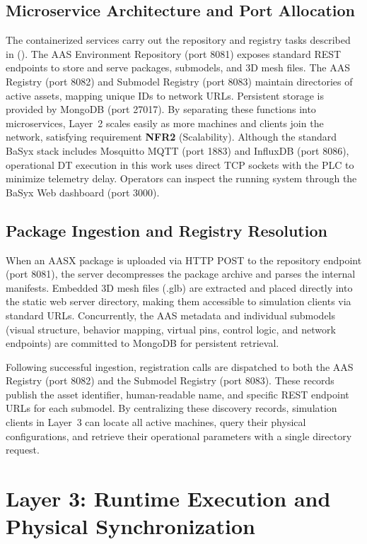\subsection{Microservice Architecture and Port Allocation}
The containerized services carry out the repository and registry tasks described in  (). The \gls{AAS} Environment Repository (port 8081) exposes standard \gls{REST} endpoints to store and serve packages, submodels, and 3D mesh files. The \gls{AAS} Registry (port 8082) and Submodel Registry (port 8083) maintain directories of active assets, mapping unique IDs to network URLs. Persistent storage is provided by MongoDB (port 27017). By separating these functions into microservices, Layer~2 scales easily as more machines and clients join the network, satisfying requirement \textbf{NFR2} (Scalability). Although the standard BaSyx stack includes Mosquitto \gls{MQTT} (port 1883) and InfluxDB (port 8086), operational \gls{DT} execution in this work uses direct \gls{TCP} sockets with the \gls{PLC} to minimize telemetry delay. Operators can inspect the running system through the BaSyx Web dashboard (port 3000).

\subsection{Package Ingestion and Registry Resolution}
When an \gls{AASX} package is uploaded via \gls{HTTP} POST to the repository endpoint (port 8081), the server decompresses the package archive and parses the internal manifests. Embedded 3D mesh files (.glb) are extracted and placed directly into the static web server directory, making them accessible to simulation clients via standard URLs. Concurrently, the \gls{AAS} metadata and individual submodels (visual structure, behavior mapping, virtual pins, control logic, and network endpoints) are committed to MongoDB for persistent retrieval.

Following successful ingestion, registration calls are dispatched to both the \gls{AAS} Registry (port 8082) and the Submodel Registry (port 8083). These records publish the asset identifier, human-readable name, and specific \gls{REST} endpoint URLs for each submodel. By centralizing these discovery records, simulation clients in Layer~3 can locate all active machines, query their physical configurations, and retrieve their operational parameters with a single directory request.

\section{Layer 3: Runtime Execution and Physical Synchronization}
\label{sec:impl_unity}

